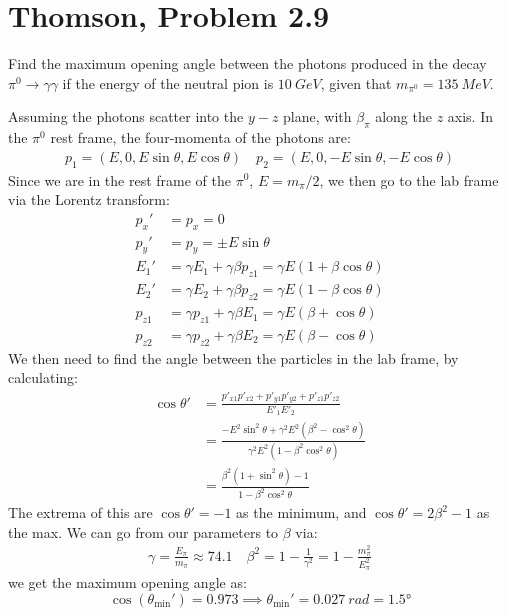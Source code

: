 \documentclass[12pt]{article}
\begin{document}
\section{Thomson, Problem 2.9}
\begin{problem}
  Find the maximum opening angle between the photons produced in the decay $\pi^0\to\gamma\gamma$ if the energy of the neutral pion is $\SI{10}{GeV}$, given that $m_{\pi^0}=\SI{135}{MeV}$.
\end{problem}
Assuming the photons scatter into the $y-z$ plane, with $\beta_\pi$ along the $z$ axis. In the $\pi^0$ rest frame, the four-momenta of the photons are:
\begin{align*}
  p_1=(E, 0, E\sin\theta, E\cos\theta)\quad
  p_2=(E, 0,-E\sin\theta,-E\cos\theta)
\end{align*}
Since we are in the rest frame of the $\pi^0$, $E=m_\pi/2$, we then go to the lab frame via the Lorentz transform:
\begin{align*}
  p_x'&=p_x=0\\
  p_y'&=p_y=\pm E\sin\theta\\
  E_1'&=\gamma E_1+\gamma\beta p_{z1}=\gamma E(1+\beta\cos\theta)\\
  E_2'&=\gamma E_2+\gamma\beta p_{z2}=\gamma E(1-\beta\cos\theta)\\
  p_{z1}&=\gamma p_{z1}+\gamma\beta E_1=\gamma E(\beta+\cos\theta)\\
  p_{z2}&=\gamma p_{z2}+\gamma\beta E_2=\gamma E(\beta-\cos\theta)
\end{align*}
We then need to find the angle between the particles in the lab frame, by calculating:
\begin{align*}
  \cos\theta'&=\frac{p'_{x1}p'_{x2}+p'_{y1}p'_{y2}+p'_{z1}p'_{z2}}{E'_1E'_2}\\
  &=\frac{-E^2\sin^2\theta+\gamma^2E^2(\beta^2-\cos^2\theta)}
  {\gamma^2E^2(1-\beta^2\cos^2\theta)}\\
  &=\frac{\beta^2(1+\sin^2\theta)-1}{1-\beta^2\cos^2\theta}
\end{align*}
The extrema of this are $\cos\theta'=-1$ as the minimum, and $\cos\theta'=2\beta^2-1$ as the max. We can go from our parameters to $\beta$ via:
\begin{align*}
  \gamma=\frac{E_\pi}{m_\pi}\approx 74.1 \quad\beta^2=1-\frac1{\gamma^2}
  =1-\frac{m_\pi^2}{E_\pi^2}
\end{align*}
we get the maximum opening angle as:
\begin{equation}
  \label{eq:p6}
  \boxed{\cos(\theta_{\text{min}}')=
    0.973\implies\theta_{\text{min}}'=\SI{0.027}{rad}=\ang{1.5}}
\end{equation}
\newpage
\end{document}
